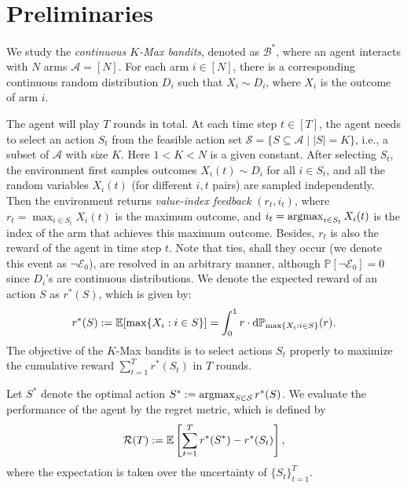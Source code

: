 \section{Preliminaries}\label{sec:preliminaries}

We study the \textit{continuous $K$-Max bandits}, denoted as $\mathcal{B}^*$, where an agent interacts with $N$ arms $\mathcal{A} = [N]$. For each arm $i \in [N]$, there is a corresponding continuous random distribution $D_i$ such that $X_i \sim D_i$, where $X_i$ is the outcome of arm $i$.

The agent will play $T$ rounds in total.
At each time step $t \in [T]$, the agent needs to select an action $S_t$ from the feasible action set $\mathcal{S}=\{S\subseteq\mathcal{A}\mid|S|=K\}$, i.e., a subset of $\mathcal{A}$ with size $K$. Here $1 < K < N$ is a given constant. 
After selecting $S_t$, the environment first samples outcomes $X_i(t)\sim D_i$ for all $i\in S_t$, and all the random variables $X_i(t)$ (for different $i,t$ pairs) are sampled independently. 
Then the environment returns \textit{value-index feedback} $(r_t,i_t)$, where $r_t=\max_{i\in S_t}X_i(t)$ is the maximum outcome, and $i_t=\operatorname*{argmax}_{i\in S_t}X_i(t)$ is the index of the arm that achieves this maximum outcome. 
Besides, $r_t$ is also the reward of the agent in time step $t$.
Note that ties, shall they occur (we denote this event as $\neg\mathcal{E}_0$), are resolved in an arbitrary manner, although $\mathbb{P}[\neg\mathcal{E}_0]=0$ since $D_i$'s are continuous distributions. 
We denote the expected reward of an action $S$ as $r^*(S)$, which is given by:
\begin{align*}
    r^*(S) := \mathbb{E}[\max\{X_i : i \in S\}] = \int_0^1 r\cdot {\textnormal{d}}{\mathbb{P}}_{\max\{X_i : i \in S\}}(r).
\end{align*}
The objective of the $K$-Max bandits is to select actions $S_t$ properly to maximize the cumulative reward $\sum_{t=1}^T r^*(S_t)$ in $T$ rounds.

Let $S^*$ denote the optimal action $S^* := \operatorname*{argmax}_{S \in {\mathcal{S}}} r^*(S)$. We evaluate the performance of the agent by the regret metric, which is defined by
\begin{align}\label{eq:def-regret}
    {\mathcal{R}}(T) := \mathbb{E}\left[ \sum_{t=1}^T r^*(S^*) - r^*(S_t) \right],
\end{align}
where the expectation is taken over the uncertainty of $\{S_t\}_{t=1}^T$. 
